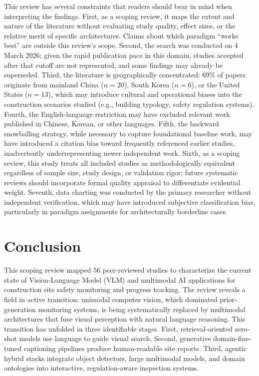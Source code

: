 \documentclass[10pt,letterpaper]{article}
\begin{document}
This review has several constraints that readers should bear in mind when interpreting the findings. First, as a scoping review, it maps the extent and nature of the literature without evaluating study quality, effect sizes, or the relative merit of specific architectures. Claims about which paradigm ``works best'' are outside this review's scope. Second, the search was conducted on 4 March 2026; given the rapid publication pace in this domain, studies accepted after that cutoff are not represented, and some findings may already be superseded. Third, the literature is geographically concentrated: 69\% of papers originate from mainland China ($n=20$), South Korea ($n=6$), or the United States ($n=13$), which may introduce cultural and operational biases into the construction scenarios studied (e.g., building typology, safety regulation systems). Fourth, the English-language restriction may have excluded relevant work published in Chinese, Korean, or other languages. Fifth, the backward snowballing strategy, while necessary to capture foundational baseline work, may have introduced a citation bias toward frequently referenced earlier studies, inadvertently underrepresenting newer independent work. Sixth, as a scoping review, this study treats all included studies as methodologically equivalent regardless of sample size, study design, or validation rigor; future systematic reviews should incorporate formal quality appraisal to differentiate evidential weight. Seventh, data charting was conducted by the primary researcher without independent verification, which may have introduced subjective classification bias, particularly in paradigm assignments for architecturally borderline cases.

\section{Conclusion}

This scoping review mapped 56 peer-reviewed studies to characterize the current state of Vision-Language Model (VLM) and multimodal AI applications for construction site safety monitoring and progress tracking. The review reveals a field in active transition: unimodal computer vision, which dominated prior-generation monitoring systems, is being systematically replaced by multimodal architectures that fuse visual perception with natural language reasoning. This transition has unfolded in three identifiable stages. First, retrieval-oriented zero-shot models use language to guide visual search. Second, generative domain-fine-tuned captioning pipelines produce human-readable site reports. Third, agentic hybrid stacks integrate object detectors, large multimodal models, and domain ontologies into interactive, regulation-aware inspection systems.
\end{document}
